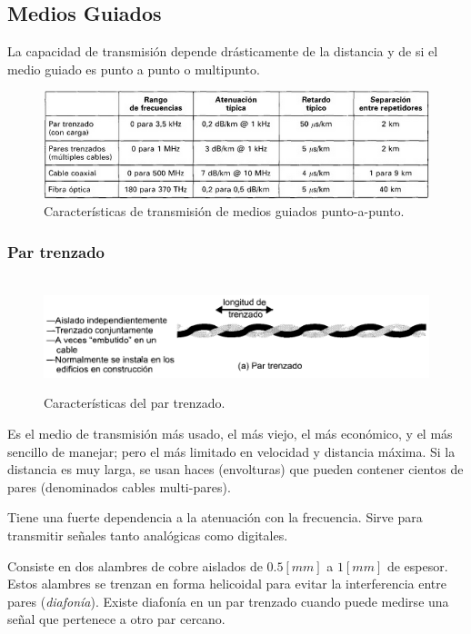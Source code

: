 \documentclass[10pt,a4paper]{article}
\begin{document}
\subsection{Medios Guiados}
La capacidad de transmisión depende drásticamente de la distancia y de si el medio guiado es punto a punto o multipunto.

\begin{figure}[ht!]
  \caption{Características de transmisión de medios guiados punto-a-punto.}
  \label{fig:mediospuntoapunto}  
  \centerline{
	\includegraphics[width=\textwidth-\fboxrule-\fboxrule]{imgs/mediospuntoapunto.png}}
\end{figure}

\subsubsection{Par trenzado}

\begin{figure}[ht!]
  \caption{Características del par trenzado.}
  \label{fig:partrenzado}  
  \centering
  \hbox{
	\includegraphics[width=\textwidth-\fboxrule-\fboxrule]{imgs/partrenzado.png}}
\end{figure}

Es el medio de transmisión más usado, el más viejo, el más económico, y el más sencillo de manejar; pero el más limitado en velocidad y distancia máxima. Si la distancia es muy larga, se usan haces (envolturas) que pueden contener cientos de pares (denominados cables multi-pares).

Tiene una fuerte dependencia a la atenuación con la frecuencia. Sirve para transmitir señales tanto analógicas como digitales.

Consiste en dos alambres de cobre aislados de $0.5[mm]$ a $1[mm]$ de espesor. Estos alambres se trenzan en forma helicoidal para evitar la interferencia entre pares (\textit{diafonía}). Existe diafonía en un par trenzado cuando puede medirse una señal que pertenece a otro par cercano. 
\end{document}
